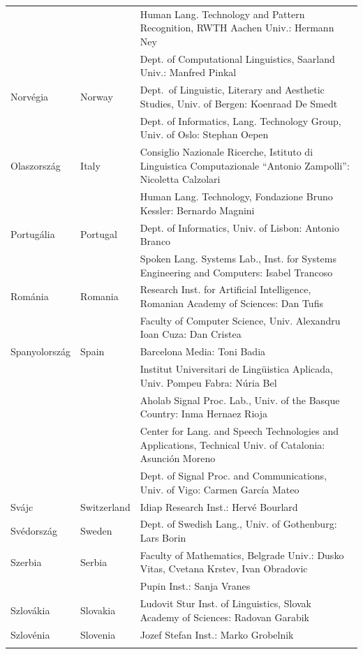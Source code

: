 \begin{longtable}{llp{105mm}}
  & & Human Lang. Technology and Pattern Recognition, RWTH Aachen Univ.: Hermann Ney \\ \addlinespace
  & & Dept. of Computational Linguistics, Saarland Univ.: Manfred Pinkal\\ \addlinespace
  Norvégia & \textcolor{grey1}{Norway} & Dept.~of Linguistic, Literary and Aesthetic Studies, Univ. of Bergen: Koenraad De Smedt\\ \addlinespace 
  & & Dept. of Informatics, Lang. Technology Group, Univ. of Oslo: Stephan Oepen \\ \addlinespace
  Olaszország & \textcolor{grey1}{Italy} & Consiglio Nazionale Ricerche, Istituto di Linguistica Computazionale “Antonio Zampolli”: Nicoletta Calzolari\\ \addlinespace
  & & Human Lang. Technology, Fondazione Bruno Kessler: Bernardo Magnini\\ \addlinespace
  Portugália & \textcolor{grey1}{Portugal} & Dept. of Informatics, Univ. of Lisbon: Antonio Branco\\ \addlinespace
  & & Spoken Lang. Systems Lab., Inst. for Systems Engineering and Computers: Isabel Trancoso \\ \addlinespace
  Románia & \textcolor{grey1}{Romania} & Research Inst. for Artificial Intelligence, Romanian Academy of Sciences: Dan Tufis \\ \addlinespace
  & & Faculty of Computer Science, Univ. Alexandru Ioan Cuza: Dan Cristea \\ \addlinespace
  Spanyolország & \textcolor{grey1}{Spain} & Barcelona Media: Toni Badia \\ \addlinespace 
  & & Institut Universitari de Lingüistica Aplicada, Univ. Pompeu Fabra: Núria Bel \\ \addlinespace 
  & & Aholab Signal Proc. Lab., Univ. of the Basque Country: Inma Hernaez Rioja \\ \addlinespace 
  & & Center for Lang. and Speech Technologies and Applications, Technical Univ. of Catalonia: Asunción Moreno \\ \addlinespace 
  & & Dept. of Signal Proc. and Communications, Univ. of Vigo: Carmen García Mateo \\ \addlinespace
  Svájc & \textcolor{grey1}{Switzerland} & Idiap Research Inst.: Hervé Bourlard \\ \addlinespace
  Svédország & \textcolor{grey1}{Sweden} & Dept. of Swedish Lang., Univ. of Gothenburg: Lars Borin \\ \addlinespace 
  Szerbia & \textcolor{grey1}{Serbia} & Faculty of Mathematics, Belgrade Univ.: Dusko Vitas, Cvetana Krstev, Ivan Obradovic \\ \addlinespace
  & & Pupin Inst.: Sanja Vranes \\ \addlinespace  
  Szlovákia & \textcolor{grey1}{Slovakia} & Ludovit Stur Inst. of Linguistics, Slovak Academy of Sciences: Radovan Garabik \\ \addlinespace 
  Szlovénia & \textcolor{grey1}{Slovenia} & Jozef Stefan Inst.: Marko Grobelnik \\ \addlinespace 
\end{longtable}
\normalsize

